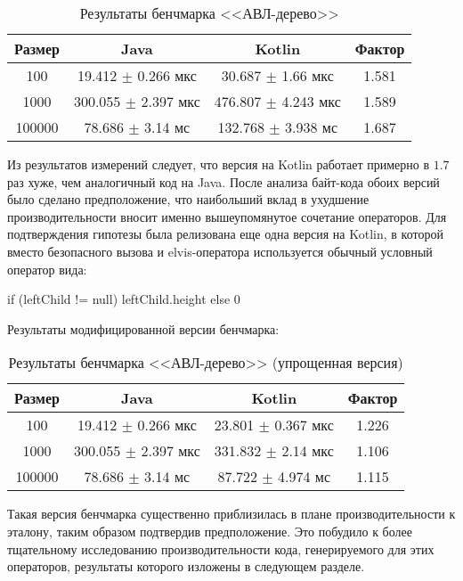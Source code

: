 \begin{table}[h]
\begin{center}
\begin{tabular}{|c|c|c|c|} \hline
Размер & Java & Kotlin & Фактор \\ \hline
100 & 19.412 $\pm$ 0.266 мкс & 30.687 $\pm$ 1.66 мкс & 1.581\\ \hline
1000 & 300.055 $\pm$ 2.397 мкс & 476.807 $\pm$ 4.243 мкс & 1.589\\ \hline
100000 & 78.686 $\pm$ 3.14 мс & 132.768 $\pm$ 3.938 мс & 1.687\\ \hline
\end{tabular}
\caption{Результаты бенчмарка <<АВЛ-дерево>>}
\end{center}
\end{table}

Из результатов измерений следует, что версия на Kotlin работает примерно в $1.7$ раз хуже, чем
аналогичный код на Java.
После анализа байт-кода обоих версий было сделано предположение, что наибольший вклад в ухудшение
производительности вносит именно вышеупомянутое сочетание операторов.
Для подтверждения гипотезы была релизована еще одна версия на Kotlin, в которой вместо
безопасного вызова и elvis-оператора используется обычный условный оператор вида:
\begin{pyglist}[language=kotlin]
if (leftChild != null) leftChild.height else 0
\end{pyglist}

Результаты модифицированной версии бенчмарка:

\begin{table}[h]
\begin{center}
\begin{tabular}{|c|c|c|c|} \hline
Размер & Java & Kotlin & Фактор \\ \hline
100 & 19.412 $\pm$ 0.266 мкс & 23.801 $\pm$ 0.367 мкс & 1.226\\ \hline
1000 & 300.055 $\pm$ 2.397 мкс & 331.832 $\pm$ 2.14 мкс & 1.106\\ \hline
100000 & 78.686 $\pm$ 3.14 мс & 87.722 $\pm$ 4.974 мс & 1.115\\ \hline
\end{tabular}
\caption{Результаты бенчмарка <<АВЛ-дерево>> (упрощенная версия)}
\end{center}
\end{table}

Такая версия бенчмарка существенно приблизилась в плане производительности к эталону, таким образом
подтвердив предположение.
Это побудило к более тщательному исследованию производительности кода, генерируемого
для этих операторов, результаты которого изложены в следующем разделе.

